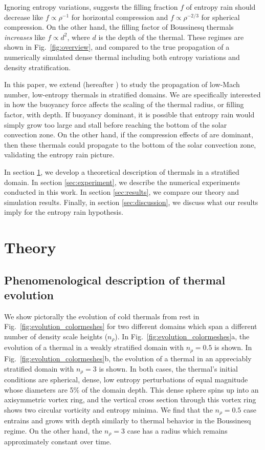 \documentclass[twocolumn, amsmath, amsfonts, amssymb, trackchanges]{aastex62}
\newcommand{\LJ}{\citetalias{lecoanet&jeevanjee2018}}
\begin{document}
Ignoring entropy variations, \citet{brandenburg2016} suggests the filling fraction $f$ of entropy rain should decrease like $f \propto \rho^{-1}$ for horizontal compression and $f \propto \rho^{-2/3}$ for spherical compression.
On the other hand, the filling factor of Boussinesq thermals \emph{increases} like $f \propto d^2$, where $d$ is the depth of the thermal.
These regimes are shown in Fig.~\ref{fig:overview}, and compared to the true propagation of a numerically simulated dense thermal including both entropy variations and density stratification.

In this paper, we extend \citet{lecoanet&jeevanjee2018} (hereafter \LJ) to study the propagation of low-Mach number, low-entropy thermals in stratified domains. 
We are specifically interested in how the buoyancy force affects the scaling of the thermal radius, or filling factor, with depth. 
If buoyancy dominant, it is possible that entropy rain would simply grow too large and stall before reaching the bottom of the solar convection zone.
On the other hand, if the compression effects of \citet{brandenburg2016} are dominant, then these thermals could propagate to the bottom of the solar convection zone, validating the entropy rain picture.

In section \ref{sec:theory}, we develop a theoretical description of thermals in a stratified domain. 
In section \ref{sec:experiment}, we describe the numerical experiments conducted in this work. 
In section \ref{sec:results}, we compare our theory and simulation results. 
Finally, in section \ref{sec:discussion}, we discuss what our results imply for the entropy rain hypothesis.

\section{Theory}
\label{sec:theory}

\subsection{Phenomenological description of thermal evolution}
We show pictorally the evolution of cold thermals from rest in Fig.~\ref{fig:evolution_colormeshes} for two different domains which span a different number of density scale heights ($n_\rho$). 
In Fig.~\ref{fig:evolution_colormeshes}a, the evolution of a thermal in a weakly stratified domain with $n_\rho = 0.5$ is shown. 
In Fig.~\ref{fig:evolution_colormeshes}b, the evolution of a thermal in an appreciably stratified domain with $n_\rho = 3$ is shown. 
In both cases, the thermal's initial conditions are spherical, dense, low entropy perturbations of equal magnitude whose diameters are 5\% of the domain depth.
This dense sphere spins up into an axisymmetric vortex ring, and the vertical cross section through this vortex ring shows two circular vorticity and entropy minima.
We find that the $n_\rho = 0.5$ case entrains and grows with depth similarly to thermal behavior in the Boussinesq regime.
On the other hand, the $n_\rho = 3$ case has a radius which remains approximately constant over time.
\end{document}
